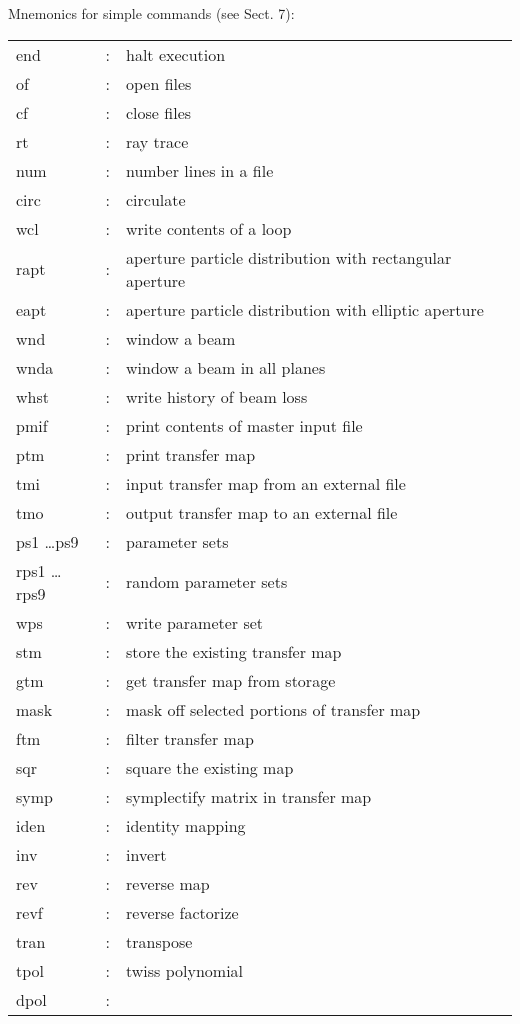 \begin{table}

Mnemonics for simple commands (see Sect. 7):

\begin{center}
\begin{tabular}{lll} end &: & halt execution\\ of &: & open files\\ cf &: &
close files\\ rt &: & ray trace\\ num &: & number lines in a file\\ circ &:
& circulate\\ wcl &: & write contents of a loop\\ rapt &: & aperture
particle distribution with rectangular aperture\\ eapt &: & aperture
particle distribution with elliptic aperture\\ wnd &: & window a beam\\
wnda &: & window a beam in all planes\\ whst &: & write history of beam
loss\\ pmif &: & print contents of master input file\\ ptm &: & print
transfer map\\ tmi &: & input transfer map from an external file\\ tmo &: &
output transfer map to an external file\\ ps1 \ldots ps9 &: & parameter
sets\\ rps1 \ldots rps9 &: & random parameter sets\\ wps &: & write
parameter set\\ stm &: & store the existing transfer map\\ gtm &: & get
transfer map from storage\\ mask &: & mask off selected portions of
transfer map\\ ftm &: & filter transfer map\\ sqr &: & square the existing
map\\ symp &: & symplectify matrix in transfer map\\ iden &: & identity
mapping\\ inv &: & invert\\ rev &: & reverse map\\ revf &: & reverse
factorize\\ tran &: & transpose\\ tpol &: & twiss polynomial\\ dpol &: &

\end{tabular}
\end{center}
\end{table}
